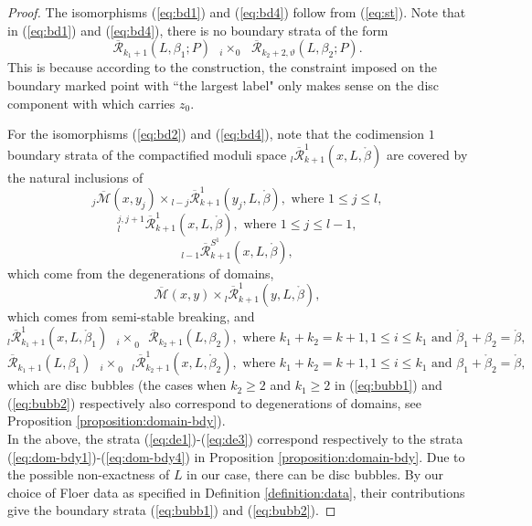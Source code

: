 \documentclass[a4paper]{article}
\numberwithin{equation}{section}
\begin{document}
\begin{proof}
The isomorphisms (\ref{eq:bd1}) and (\ref{eq:bd4}) follow from (\ref{eq:st}). Note that in (\ref{eq:bd1}) and (\ref{eq:bd4}), there is no boundary strata of the form
\begin{equation}
\overline{\mathcal{R}}_{k_1+1}(L,\beta_1;P)\textrm{ }{{}_i\times_0}\textrm{ }\overline{\mathcal{R}}_{k_2+2,\vartheta}(L,\beta_2;P).
\end{equation}
This is because according to the construction, the constraint imposed on the boundary marked point with ``the largest label" only makes sense on the disc component with which carries $z_0$.
	
For the isomorphisms (\ref{eq:bd2}) and (\ref{eq:bd4}), note that the codimension $1$ boundary strata of the compactified moduli space ${}_l\overline{\mathcal{R}}_{k+1}^1(x,L,\ring{\beta})$ are covered by the natural inclusions of
\begin{equation}\label{eq:de1}
{}_j\overline{\mathcal{M}}(x,y_j)\times{}_{l-j}\overline{\mathcal{R}}_{k+1}^1(y_j,L,\ring{\beta}),\textrm{ where }1\leq j\leq l,
\end{equation}
\begin{equation}\label{eq:de2}
{}_l^{j,j+1}\overline{\mathcal{R}}_{k+1}^1(x,L,\ring{\beta}),\textrm{ where }1\leq j\leq l-1,
\end{equation}
\begin{equation}\label{eq:de3}
{}_{l-1}\overline{\mathcal{R}}_{k+1}^{S^1}(x,L,\ring{\beta}),
\end{equation}
which come from the degenerations of domains,
\begin{equation}\label{eq:br1}
\overline{\mathcal{M}}(x,y)\times{}_l\overline{\mathcal{R}}_{k+1}^1(y,L,\ring{\beta}),
\end{equation}
which comes from semi-stable breaking, and
\begin{equation}\label{eq:bubb1}
{}_l\overline{\mathcal{R}}_{k_1+1}^1(x,L,\ring{\beta}_1)\textrm{ }{{}_i\times}_0\textrm{ }\overline{\mathcal{R}}_{k_2+1}(L,\beta_2),\textrm{ where }k_1+k_2=k+1,1\leq i\leq k_1\textrm{ and }\ring{\beta}_1+\beta_2=\ring{\beta},
\end{equation}
\begin{equation}\label{eq:bubb2}
\overline{\mathcal{R}}_{k_1+1}(L,\beta_1)\textrm{ }{{}_i\times}_0\textrm{ }{}_l\overline{\mathcal{R}}_{k_2+1}^1(x,L,\ring{\beta}_2),\textrm{ where }k_1+k_2=k+1,1\leq i\leq k_1\textrm{ and }\beta_1+\ring{\beta}_2=\ring{\beta},
\end{equation}
which are disc bubbles (the cases when $k_2\geq2$ and $k_1\geq2$ in (\ref{eq:bubb1}) and (\ref{eq:bubb2}) respectively also correspond to degenerations of domains, see Proposition \ref{proposition:domain-bdy}). \\
In the above, the strata (\ref{eq:de1})-(\ref{eq:de3}) correspond respectively to the strata (\ref{eq:dom-bdy1})-(\ref{eq:dom-bdy4}) in Proposition \ref{proposition:domain-bdy}. Due to the possible non-exactness of $L$ in our case, there can be disc bubbles. By our choice of Floer data as specified in Definition \ref{definition:data}, their contributions give the boundary strata (\ref{eq:bubb1}) and (\ref{eq:bubb2}).


\end{proof}
\end{document}

